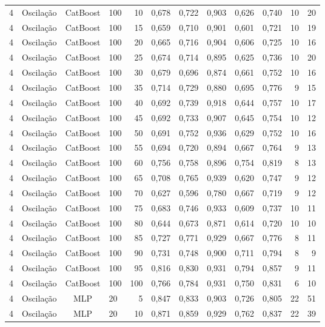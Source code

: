 \begin{longtable}{ccclrrrrrrrr}
4 & Oscilação & CatBoost & 100 & 10 & 0,678 & 0,722 & 0,903 & 0,626 & 0,740 & 10 & 20 \\
4 & Oscilação & CatBoost & 100 & 15 & 0,659 & 0,710 & 0,901 & 0,601 & 0,721 & 10 & 19 \\
4 & Oscilação & CatBoost & 100 & 20 & 0,665 & 0,716 & 0,904 & 0,606 & 0,725 & 10 & 16 \\
4 & Oscilação & CatBoost & 100 & 25 & 0,674 & 0,714 & 0,895 & 0,625 & 0,736 & 10 & 20 \\
4 & Oscilação & CatBoost & 100 & 30 & 0,679 & 0,696 & 0,874 & 0,661 & 0,752 & 10 & 16 \\
4 & Oscilação & CatBoost & 100 & 35 & 0,714 & 0,729 & 0,880 & 0,695 & 0,776 & 9 & 15 \\
4 & Oscilação & CatBoost & 100 & 40 & 0,692 & 0,739 & 0,918 & 0,644 & 0,757 & 10 & 17 \\
4 & Oscilação & CatBoost & 100 & 45 & 0,692 & 0,733 & 0,907 & 0,645 & 0,754 & 10 & 12 \\
4 & Oscilação & CatBoost & 100 & 50 & 0,691 & 0,752 & 0,936 & 0,629 & 0,752 & 10 & 16 \\
4 & Oscilação & CatBoost & 100 & 55 & 0,694 & 0,720 & 0,894 & 0,667 & 0,764 & 9 & 13 \\
4 & Oscilação & CatBoost & 100 & 60 & 0,756 & 0,758 & 0,896 & 0,754 & 0,819 & 8 & 13 \\
4 & Oscilação & CatBoost & 100 & 65 & 0,708 & 0,765 & 0,939 & 0,620 & 0,747 & 9 & 12 \\
4 & Oscilação & CatBoost & 100 & 70 & 0,627 & 0,596 & 0,780 & 0,667 & 0,719 & 9 & 12 \\
4 & Oscilação & CatBoost & 100 & 75 & 0,683 & 0,746 & 0,933 & 0,609 & 0,737 & 10 & 11 \\
4 & Oscilação & CatBoost & 100 & 80 & 0,644 & 0,673 & 0,871 & 0,614 & 0,720 & 10 & 10 \\
4 & Oscilação & CatBoost & 100 & 85 & 0,727 & 0,771 & 0,929 & 0,667 & 0,776 & 8 & 11 \\
4 & Oscilação & CatBoost & 100 & 90 & 0,731 & 0,748 & 0,900 & 0,711 & 0,794 & 8 & 9 \\
4 & Oscilação & CatBoost & 100 & 95 & 0,816 & 0,830 & 0,931 & 0,794 & 0,857 & 9 & 11 \\
4 & Oscilação & CatBoost & 100 & 100 & 0,766 & 0,784 & 0,931 & 0,750 & 0,831 & 6 & 10 \\
4 & Oscilação & MLP & 20 & 5 & 0,847 & 0,833 & 0,903 & 0,726 & 0,805 & 22 & 51 \\
4 & Oscilação & MLP & 20 & 10 & 0,871 & 0,859 & 0,929 & 0,762 & 0,837 & 22 & 39 \\

\end{longtable}
